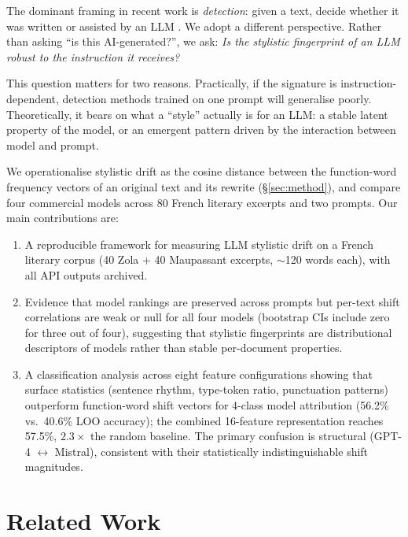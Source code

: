 \documentclass[11pt,a4paper]{article}
\begin{document}
The dominant framing in recent work is \emph{detection}: given a text,
decide whether it was written or assisted by an LLM
\citep{uchendu2023,sadasivan2023,liang2024}.
We adopt a different perspective.
Rather than asking ``is this AI-generated?'', we ask:
\textit{Is the stylistic fingerprint of an LLM robust to the instruction
it receives?}

This question matters for two reasons.
Practically, if the signature is instruction-dependent, detection
methods trained on one prompt will generalise poorly.
Theoretically, it bears on what a ``style'' actually is for an LLM:
a stable latent property of the model, or an emergent pattern
driven by the interaction between model and prompt.

We operationalise stylistic drift as the cosine distance between
the function-word frequency vectors of an original text and its rewrite
(\S\ref{sec:method}), and compare four commercial models
across 80 French literary excerpts and two prompts.
Our main contributions are:

\begin{enumerate}
  \item A reproducible framework for measuring LLM stylistic drift on
    a French literary corpus (40 Zola + 40 Maupassant excerpts, $\sim$120
    words each), with all API outputs archived.
  \item Evidence that model rankings are preserved across prompts but
    per-text shift correlations are weak or null for all four models
    (bootstrap CIs include zero for three out of four),
    suggesting that stylistic fingerprints are distributional descriptors
    of models rather than stable per-document properties.
  \item A classification analysis across eight feature configurations
    showing that surface statistics (sentence rhythm, type-token ratio,
    punctuation patterns) outperform function-word shift vectors for
    4-class model attribution (56.2\% vs.\ 40.6\% LOO accuracy);
    the combined 16-feature representation reaches 57.5\%, $2.3\times$
    the random baseline.
    The primary confusion is structural (GPT-4 $\leftrightarrow$ Mistral),
    consistent with their statistically indistinguishable shift magnitudes.
\end{enumerate}

\section{Related Work}
\end{document}
